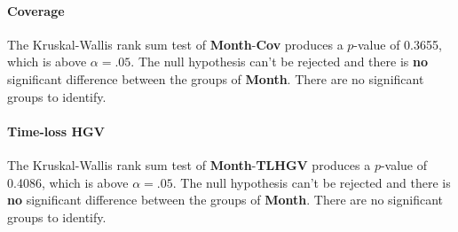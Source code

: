 \paragraph{Coverage}
The Kruskal-Wallis rank sum test of \textbf{Month}-\textbf{Cov} produces a $p$-value of 0.3655, which is above $\alpha=.05$. The null hypothesis can't be rejected and there is \textbf{no} significant difference between the groups of \textbf{Month}. There are no significant groups to identify.

\paragraph{Time-loss HGV}
The Kruskal-Wallis rank sum test of \textbf{Month}-\textbf{TLHGV} produces a $p$-value of 0.4086, which is above $\alpha=.05$. The null hypothesis can't be rejected and there is \textbf{no} significant difference between the groups of \textbf{Month}. There are no significant groups to identify.